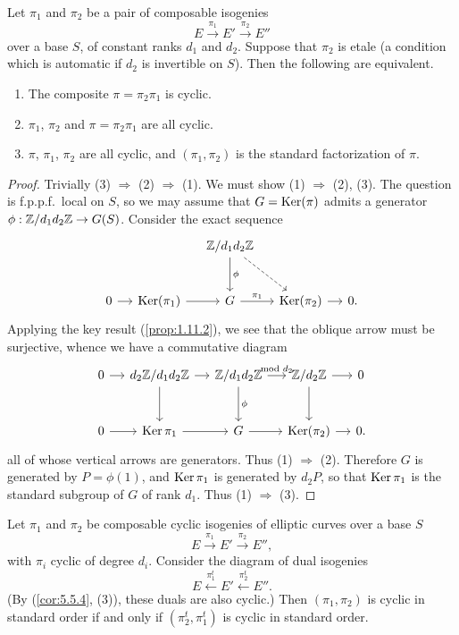 \begin{kprop}\label{prop:6.7.8}
Let $\pi_1$ and $\pi_2$ be a pair of composable isogenies
\[
E \xrightarrow{\pi_1} E' \xrightarrow{\pi_2} E''
\]
over a base $S$, of constant ranks $d_1$ and $d_2$. Suppose that $\pi_2$ is etale (a condition which is automatic if $d_2$ is invertible on $S$). Then the following are equivalent.
\begin{enumerate}[(1)]
\item The composite $\pi = \pi_2\pi_1$ is cyclic.
\item $\pi_1$, $\pi_2$ and $\pi = \pi_2\pi_1$ are all cyclic.
\item $\pi$, $\pi_1$, $\pi_2$ are all cyclic, and $(\pi_1,\pi_2)$ is the standard factorization of $\pi$.
\end{enumerate}
\end{kprop}

\begin{proof}
Trivially (3) $\Rightarrow$ (2) $\Rightarrow$ (1). We must show (1) $\Rightarrow$ (2), (3). The question is f.p.p.f.\ local on $S$, so we may assume that $G = \operatorname{Ker}(\pi)$ admits a generator $\phi : \mathbb{Z}/d_1d_2\mathbb{Z} \to G(S)$. Consider the exact sequence
\[
\begin{tikzcd}[row sep=large, column sep=small, every label/.append style={font=\scriptsize}]
& & \Z/d_1d_2\Z \arrow[d, "\phi"] \arrow[dr, dashed] & & \\
0 \arrow[r] & \Ker(\pi_1) \arrow[r] & G \arrow[r, "\pi_1"] & \Ker(\pi_2) \arrow[r] & 0 .
\end{tikzcd}
\]
Applying the key result (\ref{prop:1.11.2}), we see that the oblique arrow must be surjective, whence we have a commutative diagram
\[
\begin{tikzcd}[row sep=large, column sep=small, every label/.append style={font=\scriptsize}]
0 \arrow[r] & d_2\Z/d_1d_2\Z \arrow[r] \arrow[d] & \Z/d_1d_2\Z \arrow[r, "\mathrm{mod}\ d_2"] \arrow[d, "\phi"] & \Z/d_2\Z \arrow[r] \arrow[d] & 0 \\
0 \arrow[r] & \Ker \pi_1 \arrow[r] & G \arrow[r] & \Ker(\pi_2) \arrow[r] & 0 .
\end{tikzcd}
\]
all of whose vertical arrows are generators. Thus (1) $\Rightarrow$ (2). Therefore $G$ is generated by $P = \phi(1)$, and $\operatorname{Ker} \pi_1$ is generated by $d_2P$, so that $\operatorname{Ker} \pi_1$ is the standard subgroup of $G$ of rank $d_1$. Thus (1) $\Rightarrow$ (3).
\end{proof}

\begin{kthm}\label{thm:6.7.9}
Let $\pi_1$ and $\pi_2$ be composable cyclic isogenies of elliptic curves over a base $S$
\[
E \xrightarrow{\pi_1} E' \xrightarrow{\pi_2} E'',
\]
with $\pi_i$ cyclic of degree $d_i$. Consider the diagram of dual isogenies
\[
E \xleftarrow{\pi_1^t} E' \xleftarrow{\pi_2^t} E'' .
\]
(By (\ref{cor:5.5.4}, (3)), these duals are also cyclic.) Then $(\pi_1,\pi_2)$ is cyclic in standard order if and only if $(\pi_2^t,\pi_1^t)$ is cyclic in standard order.
\end{kthm}

